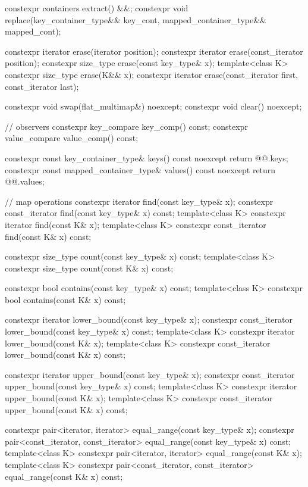 \begin{codeblock}
{{    constexpr containers extract() &&;
    constexpr void replace(key_container_type&& key_cont, mapped_container_type&& mapped_cont);

    constexpr iterator erase(iterator position);
    constexpr iterator erase(const_iterator position);
    constexpr size_type erase(const key_type& x);
    template<class K> constexpr size_type erase(K&& x);
    constexpr iterator erase(const_iterator first, const_iterator last);

    constexpr void swap(flat_multimap&) noexcept;
    constexpr void clear() noexcept;

    // observers
    constexpr key_compare key_comp() const;
    constexpr value_compare value_comp() const;

    constexpr const key_container_type& keys() const noexcept { return @@.keys; }
    constexpr const mapped_container_type& values() const noexcept { return @@.values; }

    // map operations
    constexpr iterator find(const key_type& x);
    constexpr const_iterator find(const key_type& x) const;
    template<class K> constexpr iterator find(const K& x);
    template<class K> constexpr const_iterator find(const K& x) const;

    constexpr size_type count(const key_type& x) const;
    template<class K> constexpr size_type count(const K& x) const;

    constexpr bool contains(const key_type& x) const;
    template<class K> constexpr bool contains(const K& x) const;

    constexpr iterator lower_bound(const key_type& x);
    constexpr const_iterator lower_bound(const key_type& x) const;
    template<class K> constexpr iterator lower_bound(const K& x);
    template<class K> constexpr const_iterator lower_bound(const K& x) const;

    constexpr iterator upper_bound(const key_type& x);
    constexpr const_iterator upper_bound(const key_type& x) const;
    template<class K> constexpr iterator upper_bound(const K& x);
    template<class K> constexpr const_iterator upper_bound(const K& x) const;

    constexpr pair<iterator, iterator> equal_range(const key_type& x);
    constexpr pair<const_iterator, const_iterator> equal_range(const key_type& x) const;
    template<class K>
      constexpr pair<iterator, iterator> equal_range(const K& x);
    template<class K>
      constexpr pair<const_iterator, const_iterator> equal_range(const K& x) const;

}}
\end{codeblock}
